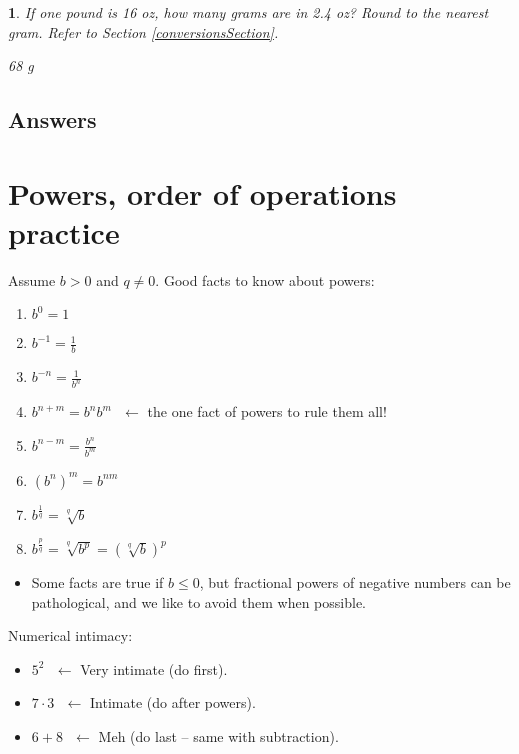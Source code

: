 \documentclass{amsbook}
\newtheorem{exc}{}
\newenvironment{ex}{\begin{exc}\normalfont}{\end{exc}}
\numberwithin{section}{chapter}
\numberwithin{equation}{chapter}
\newcommand{\qi}[1]{\begin{itemize}\item #1 \end{itemize}}
\newcommand{\ds}{\displaystyle}
\begin{document}
\begin{ex}
	If one pound is 16 oz, how many grams are in 2.4 oz? Round to the nearest gram. Refer to Section \ref{conversionsSection}. \begin{sol} 68 g\end{sol}

\end{ex}


\subsection*{Answers \nopunct} \hfill
\begin{multicols}{2}
	
\end{multicols}



\newpage
\section{Powers, order of operations practice}

Assume $b>0$ and  $q \neq 0$. Good facts to know about powers: %
\begin{enumerate}
	\item $b^0=1$
	\item $\ds{b^{-1} = \frac{1}{b}}$
	\item $\ds{b^{-n} = \frac{1}{b^n}}$
	\item $\ds{b^{n+m} = b^nb^m} \ \ \ \leftarrow $ the one fact of powers to rule them all!
	\item $\ds{b^{n-m} = \frac{b^n}{b^m}}$
	\item $\ds{\left(b^n\right)^m = b^{nm}}$
	\item $\ds{b^\frac{1}{q} = \sqrt[q]{b} }$
	\item $\ds{b^\frac{p}{q} = \sqrt[q]{\ds b^p} = \left( \sqrt[q]{b} \right)^p }$
\end{enumerate}

\noindent \qi{Some facts are true if $b\leq 0$, but fractional powers of negative numbers can be pathological, and we like to avoid them when possible.}

Numerical intimacy:
\begin{itemize}
	\item $5^2\ \ \ \leftarrow$ Very intimate (do first).
	\item $7\cdot3\ \ \ \leftarrow$ Intimate (do after powers).
	\item $6+8\ \ \ \leftarrow$ Meh (do last -- same with subtraction).
\end{itemize}
\end{document}
